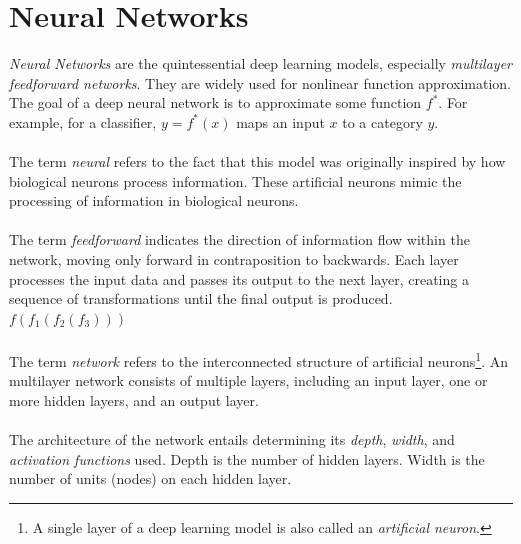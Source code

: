 \documentclass[../main.tex]{subfiles}
\begin{document}
	\chapter{Neural Networks} \label{ch:neural}

\noindent \textit{Neural Networks} are the quintessential deep learning models, especially \textit{multilayer feedforward networks}. They are widely used for nonlinear function approximation. The goal of a deep neural network is to approximate some function $f^*$. For example, for a classifier, $y = f^*(x)$ maps an input $x$ to a category $y$.  \\ \\ 
\noindent The term \textit{neural} refers  to the fact that this model was originally inspired by how biological neurons process information. These artificial neurons mimic the processing of information in biological neurons. \\ \\ 
\noindent The term \textit{feedforward} indicates the direction of information flow within the network, moving only forward in contraposition to backwards. Each layer processes the input data and passes its output to the next layer, creating a sequence of transformations until the final output is produced. $f(f_1(f_2(f_3)))$ \\ \\
\noindent The term \textit{network} refers to the interconnected structure of artificial neurons\footnote{A single layer of a deep learning model is also called an\textit{ artificial neuron}. }. An multilayer network consists of multiple layers, including an input layer, one or more hidden layers, and an output layer. \\ \\ %
\noindent The architecture of the network entails determining its \textit{depth}, \textit{width}, and \textit{activation functions} used. Depth is the number of hidden layers. Width is the number of units (nodes) on each hidden layer. 
\end{document}
